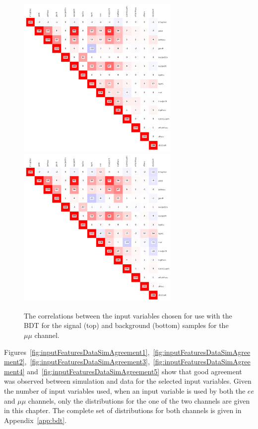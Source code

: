 \begin{figure}[!Htb]
\centering
\includegraphics[width=0.7\textwidth]{figs/background-estimation/plots/corr_sig_mumu.pdf}
\\
\includegraphics[width=0.7\textwidth]{figs/background-estimation/plots/corr_bkg_mumu.pdf}
\caption{
The correlations between the input variables chosen for use with the BDT for the signal (top) and background (bottom) samples for the $\mu\mu$ channel.}
\label{fig:corr_mumu}
\end{figure}

Figures~\ref{fig:inputFeaturesDataSimAgreement1},~\ref{fig:inputFeaturesDataSimAgreement2},~\ref{fig:inputFeaturesDataSimAgreement3},~\ref{fig:inputFeaturesDataSimAgreement4} and~\ref{fig:inputFeaturesDataSimAgreement5} show that good agreement was observed between simulation and data for the selected input variables.
Given the number of input variables used, when an input variable is used by both the $ee$ and $\mu\mu$ channels, only the distributions for the one of the two channels are given in this chapter.
The complete set of distributions for both channels is given in Appendix~\ref{app:bdt}.

